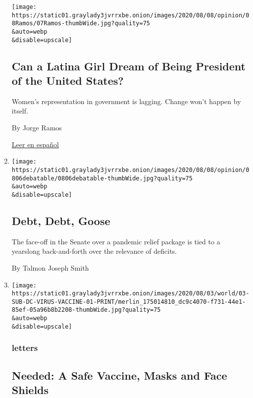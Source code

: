 \begin{enumerate}
  \texttt{[image: https://static01.graylady3jvrrxbe.onion/images/2020/08/08/opinion/08Ramos/07Ramos-thumbWide.jpg?quality=75\\\&auto=webp\\\&disable=upscale]}

  \hypertarget{can-a-latina-girl-dream-of-being-president-of-the-united-states}{%
  \subsection{Can a Latina Girl Dream of Being President of the United
  States?}\label{can-a-latina-girl-dream-of-being-president-of-the-united-states}}

  Women's representation in government is lagging. Change won't happen
  by itself.

  By Jorge Ramos

  \href{https://www.nytimes3xbfgragh.onion/es/2020/08/07/espanol/opinion/presidenta-estados-unidos.html}{Leer
  en español}
\item
  \href{/2020/08/06/opinion/debt-coronavirus-senate-republicans.html}{}

  \texttt{[image: https://static01.graylady3jvrrxbe.onion/images/2020/08/08/opinion/0806debatable/0806debatable-thumbWide.jpg?quality=75\\\&auto=webp\\\&disable=upscale]}

  \hypertarget{debt-debt-goose}{%
  \subsection{Debt, Debt, Goose}\label{debt-debt-goose}}

  The face-off in the Senate over a pandemic relief package is tied to a
  yearslong back-and-forth over the relevance of deficits.

  By Talmon Joseph Smith
\item
  \href{/2020/08/06/opinion/letters/coronavirus-vaccine.html}{}

  \texttt{[image: https://static01.graylady3jvrrxbe.onion/images/2020/08/03/world/03-SUB-DC-VIRUS-VACCINE-01-PRINT/merlin\_175014810\_dc9c4070-f731-44e1-85ef-05a96b8b2208-thumbWide.jpg?quality=75\\\&auto=webp\\\&disable=upscale]}

  \hypertarget{letters-2}{%
  \subsubsection{letters}\label{letters-2}}

  \hypertarget{needed-a-safe-vaccine-masks-and-face-shields}{%
  \subsection{Needed: A Safe Vaccine, Masks and Face
  Shields}\label{needed-a-safe-vaccine-masks-and-face-shields}}


\end{enumerate}
